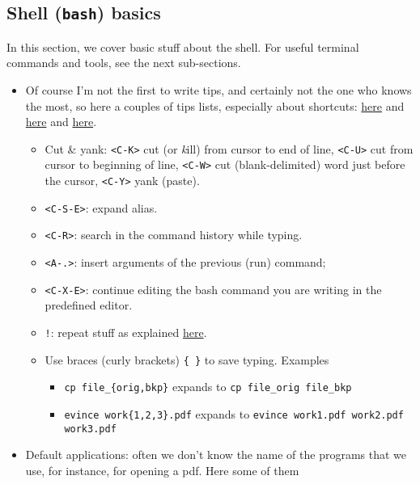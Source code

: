 \documentclass[a4paper,12pt,%
              final%
              ]{article}
\begin{document}
\subsection{Shell (\texttt{bash}) basics}
In this section, we cover basic stuff about the shell. For useful terminal commands and tools, see the next sub-sections.
\begin{itemize}
  \item Of course I'm not the first to write tips, and certainly not the one who knows the most, so here a couples of tips lists, especially about shortcuts: \href{https://www.techrepublic.com/article/20-terminal-shortcuts-developers-need-to-know/}{here} and \href{https://www.howtogeek.com/howto/ubuntu/keyboard-shortcuts-for-bash-command-shell-for-ubuntu-debian-suse-redhat-linux-etc/}{here} and \href{https://devhints.io/bash}{here}.
    \begin{itemize}
      \item Cut \& yank: \texttt{<C-K>} cut (or \emph{k}ill) from cursor to end of line, \texttt{<C-U>} cut from cursor to beginning of line, \texttt{<C-W>} cut (blank-delimited) word just before the cursor, \texttt{<C-Y>} yank (paste).
      \item \texttt{<C-S-E>}: expand alias.
      \item \texttt{<C-R>}: search in the command history while typing.
      \item \texttt{<A-.>}: insert arguments of the previous (run) command;
      \item \texttt{<C-X-E>}: continue editing the bash command you are writing in the predefined editor.
      \item \texttt{!}: repeat stuff as explained \href{https://www.redhat.com/sysadmin/bash-bang-commands}{here}.
      \item Use braces (curly brackets) \verb|{ }| to save typing. Examples
        \begin{itemize}
          \item \verb|cp file_{orig,bkp}| expands to \verb|cp file_orig file_bkp|
          \item \verb|evince work{1,2,3}.pdf| expands to \verb|evince work1.pdf work2.pdf work3.pdf|
        \end{itemize}
    \end{itemize}
  \item Default applications: often we don't know the name of the programs that we use, for instance, for opening a pdf. Here some of them
    \begin{itemize}

\end{itemize}
\end{itemize}
\end{document}
